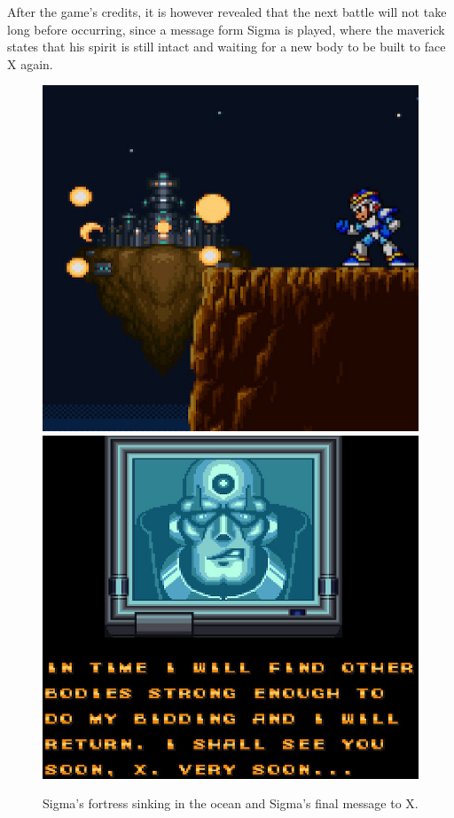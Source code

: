 After the game's credits, it is however revealed that the next battle will not take long before occurring, since a message form Sigma is played, where the maverick states that his spirit is still intact and waiting for a new body to be built to face X again.
\begin{figure}[htp]
	\centering
	\includegraphics[width=0.45\linewidth]{figures/X1/Ending.jpg}
	\includegraphics[width=0.45\linewidth]{figures/X1/sigma_message.jpg}
	\caption{Sigma's fortress sinking in the ocean and Sigma's final message to X.}
\end{figure}

